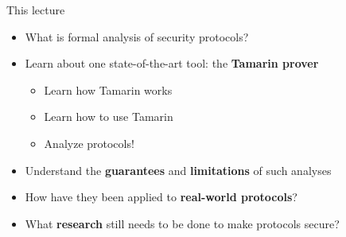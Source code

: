 \documentclass[11pt,aspectratio=169]{beamer}
\begin{document}
\begin{frame}[fragile]{This lecture}
    \begin{itemize}
        \item What is formal analysis of security protocols?
        \item Learn about one state-of-the-art tool: the \textbf{Tamarin prover}
        \begin{itemize}
            \item Learn how Tamarin works
            \item Learn how to use Tamarin
            \item Analyze protocols!
        \end{itemize}
        \item Understand the \textbf{guarantees} and \textbf{limitations} of 
              such analyses
        \item How have they been applied to \textbf{real-world protocols}?
        \item What \textbf{research} still needs to be done to make protocols 
              secure?
    \end{itemize}
\end{frame}
\end{document}
